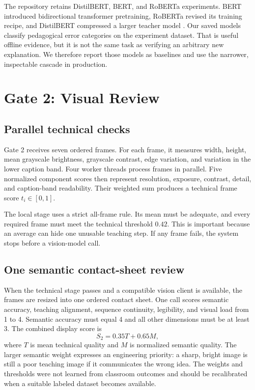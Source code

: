 \documentclass[11pt]{article}
\theoremstyle{plain}
\theoremstyle{definition}
\begin{document}
The repository retains DistilBERT, BERT, and RoBERTa experiments. BERT introduced bidirectional transformer pretraining, RoBERTa revised its training recipe, and DistilBERT compressed a larger teacher model \citep{devlin2019bert,liu2019roberta,sanh2019distilbert}. Our saved models classify pedagogical error categories on the experiment dataset. That is useful offline evidence, but it is not the same task as verifying an arbitrary new explanation. We therefore report those models as baselines and use the narrower, inspectable cascade in production.
\section{Gate 2: Visual Review}

\subsection{Parallel technical checks}

Gate 2 receives seven ordered frames. For each frame, it measures width, height, mean grayscale brightness, grayscale contrast, edge variation, and variation in the lower caption band. Four worker threads process frames in parallel. Five normalized component scores then represent resolution, exposure, contrast, detail, and caption-band readability. Their weighted sum produces a technical frame score $t_i\in[0,1]$.

The local stage uses a strict all-frame rule. Its mean must be adequate, and every required frame must meet the technical threshold $0.42$. This is important because an average can hide one unusable teaching step. If any frame fails, the system stops before a vision-model call.

\subsection{One semantic contact-sheet review}

When the technical stage passes and a compatible vision client is available, the frames are resized into one ordered contact sheet. One call scores semantic accuracy, teaching alignment, sequence continuity, legibility, and visual load from 1 to 4. Semantic accuracy must equal 4 and all other dimensions must be at least 3. The combined display score is
\begin{equation}
  S_2=0.35T+0.65M,
  \label{eq:gate2}
\end{equation}
where $T$ is mean technical quality and $M$ is normalized semantic quality. The larger semantic weight expresses an engineering priority: a sharp, bright image is still a poor teaching image if it communicates the wrong idea. The weights and thresholds were not learned from classroom outcomes and should be recalibrated when a suitable labeled dataset becomes available.
\end{document}
